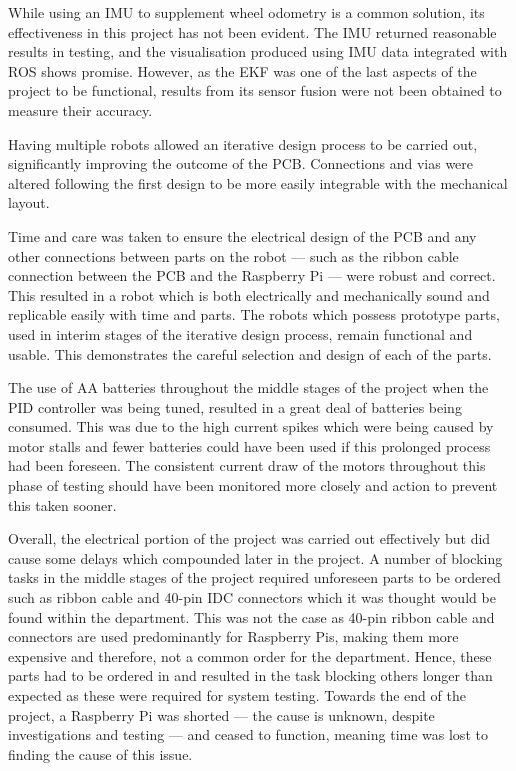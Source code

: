 While using an IMU to supplement wheel odometry is a common solution, its
effectiveness in this project has not been evident. The IMU
returned reasonable results in testing, and the visualisation produced using
IMU data integrated with ROS shows promise. However, as the EKF was one of the last aspects of the project to be functional, results from its sensor fusion were not been obtained to
measure their accuracy.

Having multiple robots allowed an
iterative design process to be carried out, significantly improving the outcome
of the PCB. Connections and vias were altered following the first design to be
more easily integrable with the mechanical layout.

Time and care was taken to ensure the electrical design of the PCB and any other
connections between parts on the robot --- such as the ribbon cable connection
between the PCB and the Raspberry Pi --- were robust and correct. This resulted
in a robot which is both electrically and mechanically sound and replicable
easily with time and parts. The robots which possess prototype parts, used in
interim stages of the iterative design process, remain functional and usable.
This demonstrates the careful selection and design of each of the parts.

The use of AA batteries throughout the middle stages of the project when the PID
controller was being tuned, resulted in a great deal of batteries being consumed.
This was due to the high current spikes which were being caused by motor stalls and
fewer batteries could have been used if this prolonged process had been foreseen. The
consistent current draw of the motors throughout this phase of testing should have
been monitored more closely and action to prevent this taken sooner.

Overall, the electrical portion of the project was carried out effectively but did
cause some delays which compounded later in the project. A number of
blocking tasks in the middle stages of the project required unforeseen parts to be
ordered such as ribbon cable and 40-pin IDC connectors which it was thought would
be found within the department. This was not the case as 40-pin ribbon cable and
connectors are used predominantly for Raspberry Pis, making them more expensive
and therefore, not a common order for the department. Hence, these parts had to be ordered in and resulted in the task blocking
others longer than expected as these were required for system testing. Towards the end of the project, a Raspberry Pi was
shorted --- the cause is unknown, despite investigations and testing --- and ceased to function,
meaning time was lost to finding the cause of this issue.

